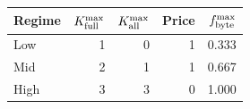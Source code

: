 \begin{tabular}{@{}lrrrr@{}}\toprule
Regime & $K_{\rm full}^{\max}$ & $K_{\rm all}^{\max}$ & Price & $f_{\rm byte}^{\max}$ \\
\midrule
Low & 1 & 0 & 1 & 0.333 \\
Mid & 2 & 1 & 1 & 0.667 \\
High & 3 & 3 & 0 & 1.000 \\
\bottomrule\end{tabular}
